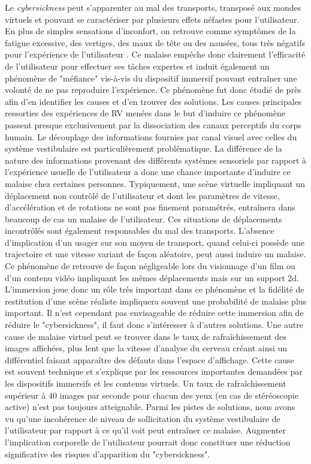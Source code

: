 Le \textit{cybersickness} peut s'apparenter au mal des transports, transposé aux mondes virtuels et pouvant se caractériser par plusieurs effets néfastes pour l'utilisateur. En plus de simples sensations d'inconfort, on retrouve comme symptômes de la fatigue excessive, des vertiges, des maux de tête ou des nausées, tous très négatifs pour l'expérience de l'utilisateur \cite{kolasinski1995simulator,laviola_jr_discussion_2000}. Ce malaise empêche donc clairement l'efficacité de l'utilisateur pour effectuer ses tâches expertes et induit également un phénomène de "méfiance" vis-à-vis du dispositif immersif pouvant entraîner une volonté de ne pas reproduire l'expérience. Ce phénomène fut donc étudié de près afin d'en identifier les causes et d'en trouver des solutions. Les causes principales ressorties des expériences de RV menées dans le but d'induire ce phénomène passent presque exclusivement par la dissociation des canaux perceptifs du corps humain. Le découplage des informations fournies par canal visuel avec celles du système vestibulaire est particulièrement problématique. La différence de la nature des informations provenant des différents systèmes sensoriels par rapport à l'expérience usuelle de l'utilisateur a donc une chance importante d'induire ce malaise chez certaines personnes\cite{reason1975motion}. 
Typiquement, une scène virtuelle impliquant un déplacement non contrôlé de l'utilisateur et dont les paramètres de vitesse, d'accélération et de rotations ne sont pas finement paramétrés, entraînera dans beaucoup de cas un malaise de l'utilisateur. Ces situations de déplacements incontrôlés sont également responsables du mal des transports. L'absence d'implication d'un usager sur son moyen de transport, quand celui-ci possède une trajectoire et une vitesse variant de façon aléatoire, peut aussi induire un malaise. Ce phénomène de retrouve de façon négligeable lors du visionnage d'un film ou d'un contenu vidéo impliquant les mêmes déplacements mais sur un support 2d. L'immersion joue donc un rôle très important dans ce phénomène et la fidélité de restitution d'une scène réaliste impliquera souvent une probabilité de malaise plus important. Il n'est cependant pas envisageable de réduire cette immersion afin de réduire le "cybersickness", il faut donc s'intéresser à d'autres solutions. Une autre cause de malaise virtuel peut se trouver dans le taux de rafraîchissement des images affichées, plus lent que la vitesse d'analyse du cerveau créant ainsi un différentiel faisant apparaître des défauts dans l'espace d'affichage. Cette cause est souvent technique et s'explique par les ressources importantes demandées par les dispositifs immersifs et les contenus virtuels. Un taux de rafraîchissement supérieur à 40 images par seconde pour chacun des yeux (en cas de stéréoscopie active) n'est pas toujours atteignable. Parmi les pistes de solutions, nous avons vu qu'une incohérence de niveau de sollicitation du système vestibulaire de l'utilisateur par rapport à ce qu'il voit peut entraîner ce malaise. Augmenter l'implication corporelle de l'utilisateur pourrait donc constituer une réduction significative des risques d'apparition du "cybersickness".

